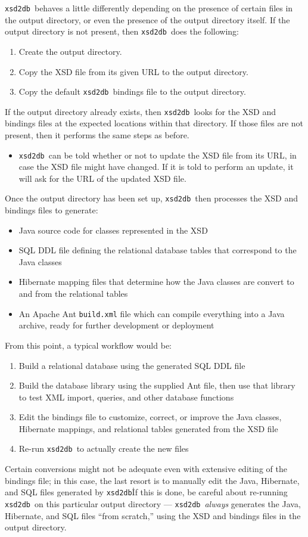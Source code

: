 \documentclass[10pt]{bmc_article}
\newenvironment{bmcformat}{\begin{raggedright}\baselineskip20pt\sloppy\setboolean{publ}{false}}{\end{raggedright}\baselineskip20pt\sloppy}
\def\xsd2db{\texttt{xsd2db}}
\begin{document}
\begin{bmcformat}
\xsd2db\ behaves a little differently depending on the presence of certain files in the output directory, or even the presence of the output directory itself.  If the output directory is not present, then \xsd2db\ does the following:
\begin{enumerate}
\item Create the output directory.
\item Copy the XSD file from its given URL to the output directory.
\item Copy the default \xsd2db\ bindings file to the output directory.
\end{enumerate}
If the output directory already exists, then \xsd2db\ looks for the XSD and bindings files at the expected locations within that directory.  If those files are not present, then it performs the same steps as before.
\begin{itemize}
\item \xsd2db\ can be told whether or not to update the XSD file from its URL, in case the XSD file might have changed.  If it is told to perform an update, it will ask for the URL of the updated XSD file.
\end{itemize}
Once the output directory has been set up, \xsd2db\ then processes the XSD and bindings files to generate:
\begin{itemize}
\item Java source code for classes represented in the XSD
\item SQL DDL file defining the relational database tables that correspond to the Java classes
\item Hibernate mapping files that determine how the Java classes are convert to and from the relational tables
\item An Apache Ant \texttt{build.xml} file which can compile everything into a Java archive, ready for further development or deployment
\end{itemize}
From this point, a typical workflow would be:
\begin{enumerate}
\item Build a relational database using the generated SQL DDL file
\item Build the database library using the supplied Ant file, then use that library to test XML import, queries, and other database functions
\item Edit the bindings file to customize, correct, or improve the Java classes, Hibernate mappings, and relational tables generated from the XSD file
\item Re-run \xsd2db\ to actually create the new files
\end{enumerate}
Certain conversions might not be adequate even with extensive editing of the bindings file; in this case, the last resort is to manually edit the Java, Hibernate, and SQL files generated by \xsd2db\.  If this is done, be careful about re-running \xsd2db\ on this particular output directory --- \xsd2db\ \emph{always} generates the Java, Hibernate, and SQL files ``from scratch,'' using the XSD and bindings files in the output directory.\pb


\end{bmcformat}
\end{document}
